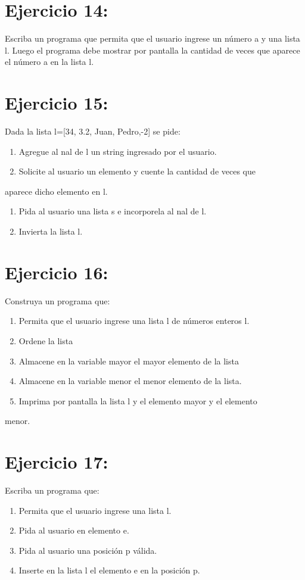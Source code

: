 \documentclass[11pt]{article}
\begin{document}
\section{Ejercicio 14:}
\label{sec:org71a819f}
Escriba un programa que permita que el usuario ingrese un
número a y una lista l. Luego el programa debe mostrar por pantalla
la cantidad de veces que aparece el número a en la lista l.
\section{Ejercicio 15:}
\label{sec:org599b37b}
Dada la lista l=[34, 3.2, Juan, Pedro,-2] se pide:
\begin{enumerate}
\item Agregue al nal de l un string ingresado por el usuario.
\item Solicite al usuario un elemento y cuente la cantidad de veces que
\end{enumerate}
aparece dicho elemento en l.
\begin{enumerate}
\item Pida al usuario una lista s e incorporela al nal de l.
\item Invierta la lista l.
\end{enumerate}
\section{Ejercicio 16:}
\label{sec:org9a67428}
Construya un programa que:
\begin{enumerate}
\item Permita que el usuario ingrese una lista l de números enteros l.
\item Ordene la lista
\item Almacene en la variable mayor el mayor elemento de la lista
\item Almacene en la variable menor el menor elemento de la lista.
\item Imprima por pantalla la lista l y el elemento mayor y el elemento
\end{enumerate}
menor.
\section{Ejercicio 17:}
\label{sec:org77de181}
Escriba un programa que:
\begin{enumerate}
\item Permita que el usuario ingrese una lista l.
\item Pida al usuario en elemento e.
\item Pida al usuario una posición p válida.
\item Inserte en la lista l el elemento e en la posición p.
\end{enumerate}
\end{document}
